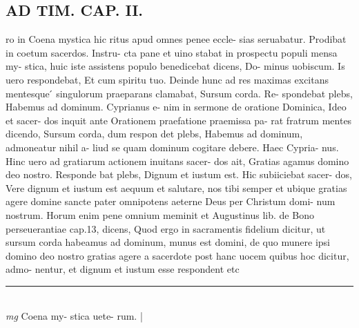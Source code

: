 \documentclass{article}
\begin{document}
\begin{pages}
\section*{AD TIM. CAP. II. }
\marginpar{[ p.110 ]}\pstart ro in Coena mystica hic ritus apud omnes penee eccle- sias seruabatur. Prodibat in coetum sacerdos. Instru- cta pane et uino stabat in prospectu populi mensa my- stica, huic iste assistens populo benedicebat dicens, Do- minus uobiscum. Is uero respondebat, Et cum spiritu tuo. Deinde hunc ad res maximas excitans mentesque ́ singulorum praeparans clamabat, Sursum corda. Re- spondebat plebs, Habemus ad dominum. Cyprianus e- nim in sermone de oratione Dominica, Ideo et sacer- dos inquit ante Orationem praefatione praemissa pa- rat fratrum mentes dicendo, Sursum corda, dum respon det plebs, Habemus ad dominum, admoneatur nihil a- liud se quam dominum cogitare debere. Haec Cypria- nus. Hinc uero ad gratiarum actionem inuitans sacer- dos ait, Gratias agamus domino deo nostro. Responde bat plebs, Dignum et iustum est. Hic subiiciebat sacer- dos, Vere dignum et iustum est aequum et salutare, nos tibi semper et ubique gratias agere domine sancte pater omnipotens aeterne Deus per Christum domi- num nostrum. Horum enim pene omnium meminit et Augustinus lib. de Bono perseuerantiae cap.13, dicens, Quod ergo in sacramentis fidelium dicitur, ut sursum corda habeamus ad dominum, munus est domini, de quo munere ipsi domino deo nostro gratias agere a sacerdote post hanc uocem quibus hoc dicitur, admo- nentur, et dignum et iustum esse respondent etc  \pend
\vspace{0.5cm}\noindent
\vspace{0.2cm}\rule{1cm}{0.2pt}\\ 
\hspace{0.2cm}\textit{mg}
\footnotesize Coena my- stica uete- rum. 
\normalsize| 

\end{pages}
\end{document}
